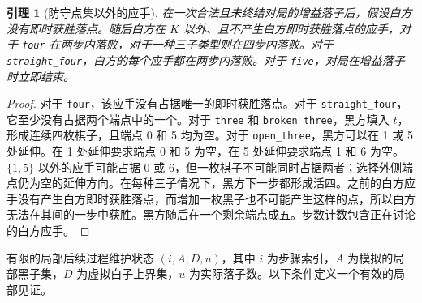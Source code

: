 \documentclass[11pt]{article}
\newtheorem{lemma}[theorem]{引理}
\theoremstyle{definition}
\theoremstyle{remark}
\begin{document}
\begin{lemma}[防守点集以外的应手]\label{mac:operator-reply}
在一次合法且未终结对局的增益落子后，假设白方没有即时获胜落点。随后白方在 \(K\) 以外、且不产生白方即时获胜落点的应手，对于 \texttt{four} 在两步内落败，对于一种三子类型则在四步内落败。对于 \texttt{straight\_four}，白方的每个应手都在两步内落败。对于 \texttt{five}，对局在增益落子时立即结束。

\end{lemma}
\begin{proof}
对于 \texttt{four}，该应手没有占据唯一的即时获胜落点。对于 \texttt{straight\_four}，它至少没有占据两个端点中的一个。对于 \texttt{three} 和 \texttt{broken\_three}，黑方填入 \(t\)，形成连续四枚棋子，且端点 0 和 5 均为空。对于 \texttt{open\_three}，黑方可以在 1 或 5 处延伸。在 1 处延伸要求端点 0 和 5 为空，在 5 处延伸要求端点 1 和 6 为空。\(\{1,5\}\) 以外的应手可能占据 0 或 6，但一枚棋子不可能同时占据两者；选择外侧端点仍为空的延伸方向。在每种三子情况下，黑方下一步都形成活四。之前的白方应手没有产生白方即时获胜落点，而增加一枚黑子也不可能产生这样的点，所以白方无法在其间的一步中获胜。黑方随后在一个剩余端点成五。步数计数包含正在讨论的白方应手。
\end{proof}

有限的局部后续过程维护状态 \((i,A,D,u)\)，其中 \(i\) 为步骤索引，\(A\) 为模拟的局部黑子集，\(D\) 为虚拟白子上界集，\(u\) 为实际落子数。以下条件定义一个有效的局部见证。
\end{document}
